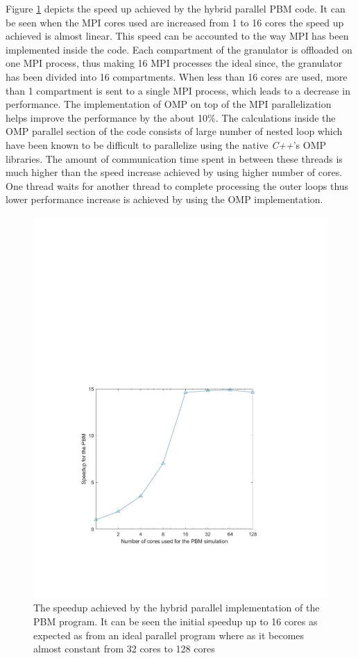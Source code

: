 \documentclass[preprint,11pt,authoryear]{elsarticle}
\begin{document}
Figure \ref{fig:rslts_PBM_speed_up} depicts the speed up achieved by the hybrid parallel PBM code. It 
can be seen when the MPI cores used are increased from 1 to 16 cores the speed up achieved is 
almost linear. This speed can be accounted to the way MPI has been implemented inside the code. 
Each compartment of the granulator is  offloaded on one MPI process, thus making 16 MPI processes 
the ideal since, the granulator has been divided into 16 compartments. When less than 16 cores are used, 
more than 1 compartment is sent to a single MPI process, which leads to a 
decrease in performance. The implementation of OMP on top of the MPI parallelization helps improve 
the performance by the about 10\%. The calculations inside the OMP parallel section of the code 
consists of large number of nested loop which have been known to be difficult to parallelize 
\citep{He2016} using the native \textit{C++}'s OMP libraries. The amount of communication time spent in 
between these threads is much higher than the speed increase achieved by using higher number of 
cores. One thread waits for another thread to complete processing the outer loops thus lower 
performance increase is achieved by using the OMP implementation. \\

\begin{figure}
\centering
\includegraphics[scale=0.75]{rslsts_PBM_speedup_logx.pdf}
\caption{The speedup achieved by the hybrid parallel implementation of the PBM program. It can be 
seen the initial speedup up to 16 cores as expected as from an ideal parallel 
program where as it 
becomes almost constant from 32 cores to 128 cores}
\label{fig:rslts_PBM_speed_up}
\end{figure}
\end{document}
